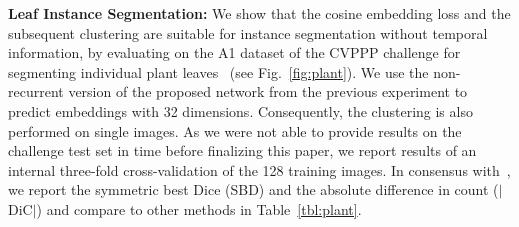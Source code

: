 \documentclass[runningheads,a4paper]{llncs}
\newcommand{\thomas}[1]{\textcolor{purple}{[#1]}}
\begin{document}
\noindent\textbf{Leaf Instance Segmentation:}
We show that the cosine embedding loss and the subsequent clustering are suitable for instance segmentation without temporal information, by evaluating on the A1 dataset of the CVPPP challenge for segmenting individual plant leaves~\cite{Minervini2016} (see Fig.~\ref{fig:plant}).
We use the non-recurrent version of the proposed network from the previous experiment to predict embeddings with 32 dimensions.
Consequently, the clustering is also performed on single images.
As we were not able to provide results on the challenge test set in time before finalizing this paper, we report results of an internal three-fold cross-validation of the 128 training images.
In consensus with~\cite{Scharr2016}, we report the symmetric best Dice (SBD) and the absolute difference in count ($|$DiC$|$) and compare to other methods in Table~\ref{tbl:plant}.

\end{document}

